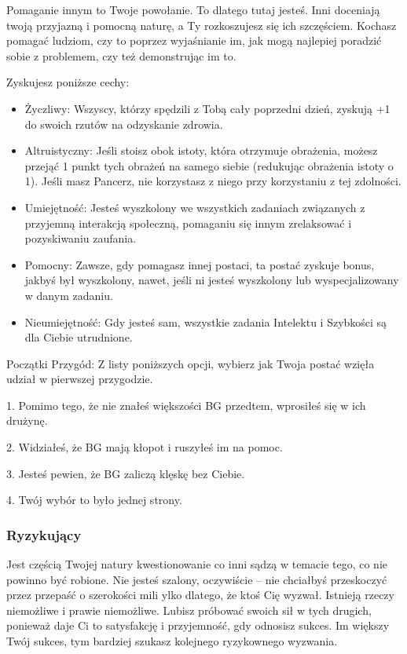 Pomaganie innym to Twoje powołanie. To dlatego tutaj jesteś. Inni doceniają twoją przyjazną i pomocną naturę, a Ty rozkoszujesz się ich szczęściem. Kochasz pomagać ludziom, czy to poprzez wyjaśnianie im, jak mogą najlepiej poradzić sobie z problemem, czy też demonstrując im to.

Zyskujesz poniższe cechy:
\begin{itemize}
    \item Życzliwy: Wszyscy, którzy spędzili z Tobą cały poprzedni dzień, zyskują +1 do swoich rzutów na odzyskanie zdrowia.
    \item Altruistyczny: Jeśli stoisz obok istoty, która otrzymuje obrażenia, możesz przejąć 1 punkt tych obrażeń na samego siebie (redukując obrażenia istoty o 1). Jeśli masz Pancerz, nie korzystasz z niego przy korzystaniu z tej zdolności.
    \item Umiejętność: Jesteś wyszkolony we wszystkich zadaniach związanych z przyjemną interakcją społeczną, pomaganiu się innym zrelaksować i pozyskiwaniu zaufania.
    \item Pomocny: Zawsze, gdy pomagasz innej postaci, ta postać zyskuje bonus, jakbyś był wyszkolony, nawet, jeśli ni jesteś wyszkolony lub wyspecjalizowany w danym zadaniu.
    \item Nieumiejętność: Gdy jesteś sam, wszystkie zadania Intelektu i Szybkości są dla Ciebie utrudnione.
\end{itemize}

Początki Przygód: Z listy poniższych opcji, wybierz jak Twoja postać wzięła udział w pierwszej przygodzie.

1. Pomimo tego, że nie znałeś większości BG przedtem, wprosiłeś się w ich drużynę.

2. Widziałeś, że BG mają kłopot i ruszyłeś im na pomoc.

3. Jesteś pewien, że BG zaliczą klęskę bez Ciebie.

4. Twój wybór to było  jednej strony.

\subsubsection{Ryzykujący}

Jest częścią Twojej natury kwestionowanie co inni sądzą w temacie tego, co nie powinno być robione. Nie jesteś szalony, oczywiście – nie chciałbyś przeskoczyć przez przepaść o szerokości mili ylko dlatego, że ktoś Cię wyzwał. Istnieją rzeczy niemożliwe i prawie niemożliwe. Lubisz próbować swoich sił w tych drugich, ponieważ daje Ci to satysfakcję i przyjemność, gdy odnosisz sukces. Im większy Twój sukces, tym bardziej szukasz kolejnego ryzykownego wyzwania.

